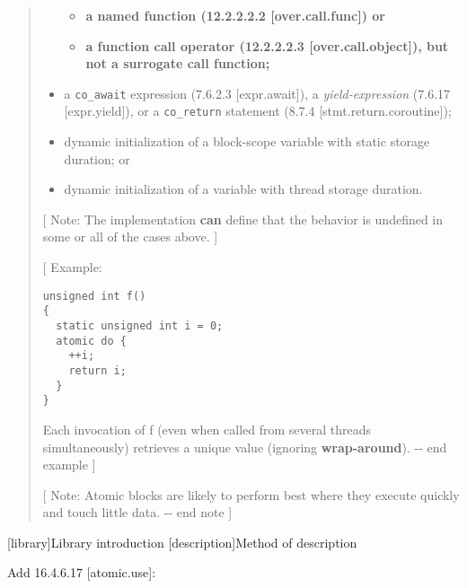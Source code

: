 \begin{quote}
\begin{itemize}
  \begin{itemize}
  \tightlist
  \item
    \textbf{a named function (12.2.2.2.2 {[}over.call.func{]}) or}
  \item
    \textbf{a function call operator (12.2.2.2.3
    {[}over.call.object{]}), but not a surrogate call function;}
  \end{itemize}
\item
  a \texttt{co\_await} expression (7.6.2.3 {[}expr.await{]}), a
  \emph{yield-expression} (7.6.17 {[}expr.yield{]}), or a
  \texttt{co\_return} statement (8.7.4 {[}stmt.return.coroutine{]});
\item
  dynamic initialization of a block-scope variable with static storage
  duration; or
\item
  dynamic initialization of a variable with thread storage duration.
\end{itemize}

{[} Note: The implementation \textbf{can} define that the behavior is
undefined in some or all of the cases above. {]}

{[} Example:

\begin{verbatim}
unsigned int f()
{
  static unsigned int i = 0;
  atomic do {
    ++i;
    return i;
  }
}
\end{verbatim}

Each invocation of f (even when called from several threads
simultaneously) retrieves a unique value (ignoring
\textbf{wrap-around}). -\/- end example {]}

{[} Note: Atomic blocks are likely to perform best where they execute
quickly and touch little data. -\/- end note {]}
\end{quote}

[library]{Library introduction}
[description]{Method of description} 

\pnum

Add 16.4.6.17 {[}atomic.use{]}:

